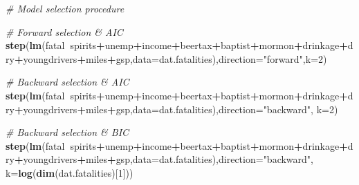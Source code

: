 \documentclass[12pt,]{book}
\newenvironment{Shaded}{\begin{snugshade}}{\end{snugshade}}
\newcommand{\KeywordTok}[1]{\textcolor[rgb]{0.13,0.29,0.53}{\textbf{#1}}}
\newcommand{\DataTypeTok}[1]{\textcolor[rgb]{0.13,0.29,0.53}{#1}}
\newcommand{\DecValTok}[1]{\textcolor[rgb]{0.00,0.00,0.81}{#1}}
\newcommand{\StringTok}[1]{\textcolor[rgb]{0.31,0.60,0.02}{#1}}
\newcommand{\CommentTok}[1]{\textcolor[rgb]{0.56,0.35,0.01}{\textit{#1}}}
\newcommand{\OperatorTok}[1]{\textcolor[rgb]{0.81,0.36,0.00}{\textbf{#1}}}
\newcommand{\NormalTok}[1]{#1}
\begin{document}
\begin{Shaded}
\begin{Highlighting}[]
\CommentTok{# Model selection procedure }

\CommentTok{# Forward selection & AIC}
\KeywordTok{step}\NormalTok{(}\KeywordTok{lm}\NormalTok{(fatal}\OperatorTok{~}\NormalTok{spirits}\OperatorTok{+}\NormalTok{unemp}\OperatorTok{+}\NormalTok{income}\OperatorTok{+}\NormalTok{beertax}\OperatorTok{+}\NormalTok{baptist}\OperatorTok{+}\NormalTok{mormon}\OperatorTok{+}\NormalTok{drinkage}\OperatorTok{+}\NormalTok{dry}\OperatorTok{+}\NormalTok{youngdrivers}\OperatorTok{+}\NormalTok{miles}\OperatorTok{+}\NormalTok{gsp,}\DataTypeTok{data=}\NormalTok{dat.fatalities),}\DataTypeTok{direction=}\StringTok{"forward"}\NormalTok{,}\DataTypeTok{k=}\DecValTok{2}\NormalTok{) }


\CommentTok{# Backward selection & AIC}
\KeywordTok{step}\NormalTok{(}\KeywordTok{lm}\NormalTok{(fatal}\OperatorTok{~}\NormalTok{spirits}\OperatorTok{+}\NormalTok{unemp}\OperatorTok{+}\NormalTok{income}\OperatorTok{+}\NormalTok{beertax}\OperatorTok{+}\NormalTok{baptist}\OperatorTok{+}\NormalTok{mormon}\OperatorTok{+}\NormalTok{drinkage}\OperatorTok{+}\NormalTok{dry}\OperatorTok{+}\NormalTok{youngdrivers}\OperatorTok{+}\NormalTok{miles}\OperatorTok{+}\NormalTok{gsp,}\DataTypeTok{data=}\NormalTok{dat.fatalities),}\DataTypeTok{direction=}\StringTok{"backward"}\NormalTok{, }\DataTypeTok{k=}\DecValTok{2}\NormalTok{)}



\CommentTok{# Backward selection & BIC}
\KeywordTok{step}\NormalTok{(}\KeywordTok{lm}\NormalTok{(fatal}\OperatorTok{~}\NormalTok{spirits}\OperatorTok{+}\NormalTok{unemp}\OperatorTok{+}\NormalTok{income}\OperatorTok{+}\NormalTok{beertax}\OperatorTok{+}\NormalTok{baptist}\OperatorTok{+}\NormalTok{mormon}\OperatorTok{+}\NormalTok{drinkage}\OperatorTok{+}\NormalTok{dry}\OperatorTok{+}\NormalTok{youngdrivers}\OperatorTok{+}\NormalTok{miles}\OperatorTok{+}\NormalTok{gsp,}\DataTypeTok{data=}\NormalTok{dat.fatalities),}\DataTypeTok{direction=}\StringTok{"backward"}\NormalTok{, }\DataTypeTok{k=}\KeywordTok{log}\NormalTok{(}\KeywordTok{dim}\NormalTok{(dat.fatalities)[}\DecValTok{1}\NormalTok{]))}
\end{Highlighting}
\end{Shaded}
\end{document}
